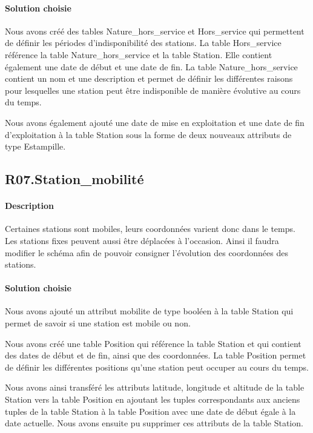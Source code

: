 \documentclass{article}
\begin{document}
\paragraph{Solution choisie}
Nous avons créé des tables Nature\_hors\_service et Hors\_service qui permettent
de définir les périodes d'indisponibilité des stations. La table Hors\_service
référence la table Nature\_hors\_service et la table Station. Elle contient
également une date de début et une date de fin. La table Nature\_hors\_service
contient un nom et une description et permet de définir les différentes
raisons pour lesquelles une station peut être indisponible de manière 
évolutive au cours du temps.

Nous avons également ajouté une date de mise en exploitation et une date de fin
d'exploitation à la table Station sous la forme de deux nouveaux attributs de type
Estampille.

\subsection{R07.Station\_mobilité}
\paragraph{Description} Certaines stations sont mobiles, leurs coordonnées varient donc dans le temps. Les stations fixes peuvent aussi
être déplacées à l'occasion. Ainsi il faudra modifier le schéma afin 
de pouvoir consigner l'évolution des coordonnées des stations.

\paragraph{Solution choisie}
Nous avons ajouté un attribut mobilite de type booléen à la table Station qui permet de savoir
si une station est mobile ou non.

Nous avons créé une table Position qui référence la table Station et qui contient
des dates de début et de fin, ainsi que des coordonnées. La table Position permet
de définir les différentes positions qu'une station peut occuper au cours du temps.

Nous avons ainsi transféré les attributs latitude, longitude et altitude de la table Station
vers la table Position en ajoutant les tuples correspondants aux anciens
tuples de la table Station à la table Position avec une date de début égale à la date
actuelle. Nous avons ensuite pu supprimer ces attributs de la table Station.
\end{document}
